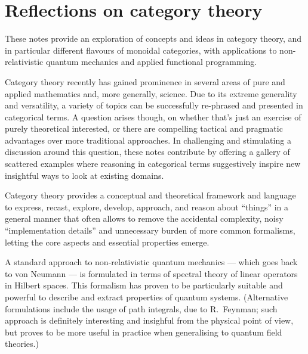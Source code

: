 \chapter*{Reflections on category theory}


These notes provide an exploration of concepts and ideas in category theory, and in particular different flavours of monoidal categories, with applications to non-relativistic quantum mechanics and applied functional programming. 

Category theory recently has gained prominence in several areas of pure and applied mathematics and, more generally, science. 
Due to its extreme generality and versatility, a variety of topics can be successfully re-phrased and presented in categorical terms. 
A question arises though, on whether that's just an exercise of purely theoretical interested, or there are compelling tactical and pragmatic advantages over more traditional approaches. 
In challenging and stimulating a discussion around this question, 
these notes contribute by offering a gallery of scattered examples where reasoning in categorical terms suggestively inspire new insightful ways to look at existing domains. 

Category theory provides a conceptual and theoretical framework and language to express, recast, explore, develop, approach, and reason about ``things'' in a general manner that often allows to remove the accidental complexity, noisy ``implementation details'' and unnecessary burden of more common formalisms, letting the core aspects and essential properties emerge. 

A standard approach to non-relativistic quantum mechanics --- which goes back to von Neumann --- is formulated in terms of spectral theory of linear operators in Hilbert spaces. This formalism has proven to be particularly suitable and powerful to describe and extract properties of quantum systems. (Alternative formulations include the usage of path integrals, due to R.~Feynman; such approach is definitely interesting and insighful from the physical point of view, but proves to be more useful in practice when generalising to quantum field theories.) 



